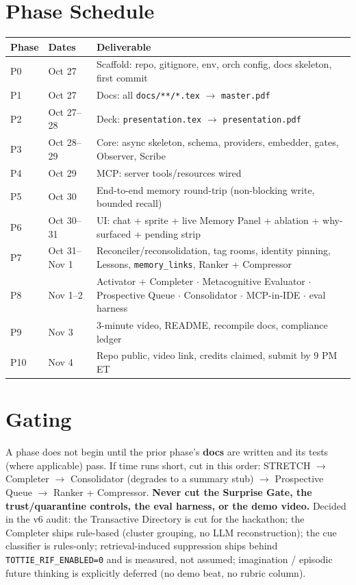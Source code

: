 \section{Phase Schedule}
\begin{longtable}{@{}p{}p{}p{}@{}}
\toprule
Phase & Dates & Deliverable \\
\midrule
P0 & Oct 27 & Scaffold: repo, gitignore, env, orch config, docs skeleton, first commit \\
P1 & Oct 27 & Docs: all \texttt{docs/**/*.tex} $\rightarrow$ \texttt{master.pdf} \\
P2 & Oct 27--28 & Deck: \texttt{presentation.tex} $\rightarrow$ \texttt{presentation.pdf} \\
P3 & Oct 28--29 & Core: async skeleton, schema, providers, embedder, gates, Observer, Scribe \\
P4 & Oct 29 & MCP: server tools/resources wired \\
P5 & Oct 30 & End-to-end memory round-trip (non-blocking write, bounded recall) \\
P6 & Oct 30--31 & UI: chat + sprite + live Memory Panel + ablation + why-surfaced + pending strip \\
P7 & Oct 31--Nov 1 & Reconciler/reconsolidation, tag rooms, identity pinning, Lessons, \texttt{memory\_links}, Ranker + Compressor \\
P8 & Nov 1--2 & Activator + Completer $\cdot$ Metacognitive Evaluator $\cdot$ Prospective Queue $\cdot$ Consolidator $\cdot$ MCP-in-IDE $\cdot$ eval harness \\
P9 & Nov 3 & 3-minute video, README, recompile docs, compliance ledger \\
P10 & Nov 4 & Repo public, video link, credits claimed, submit by 9 PM ET \\
\bottomrule
\end{longtable}

\section{Gating}
A phase does not begin until the prior phase's \textbf{docs} are written and its tests (where
applicable) pass. If time runs short, cut in this order: STRETCH $\rightarrow$ Completer $\rightarrow$
Consolidator (degrades to a summary stub) $\rightarrow$ Prospective Queue $\rightarrow$ Ranker + Compressor.
\textbf{Never cut the Surprise Gate, the trust/quarantine controls, the eval harness, or the demo video.}
Decided in the v6 audit: the Transactive Directory is cut for the hackathon; the Completer ships
rule-based (cluster grouping, no LLM reconstruction); the cue classifier is rules-only;
retrieval-induced suppression ships behind \texttt{TOTTIE\_RIF\_ENABLED=0} and is measured, not
assumed; imagination / episodic future thinking is explicitly deferred (no demo beat, no rubric
column).

